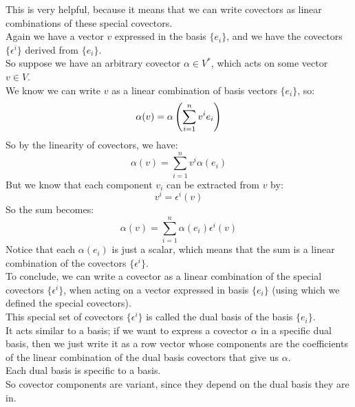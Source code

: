 \documentclass[12pt]{article}
\begin{document}
This is very helpful, because it means
that we can write covectors as linear
combinations of these special covectors. \\
Again we have a vector $v$ expressed
in the basis $\{ e_i \}$,
and we have the covectors $\{\epsilon^i\}$
derived from $\{ e_i \}$. \\
So suppose we have an arbitrary covector
$\alpha \in V^*$,
which acts on some vector $v \in V$. \\
We know we can write $v$ as a linear
combination of basis vectors $\{e_i\}$, so:
\[ \alpha(v) 
= \alpha\left( \sum_{i = 1}^{n} v^ie_i \right) \]
So by the linearity of covectors, we have:
\[ \alpha(v) = \sum_{i = 1}^{n} v^i\alpha(e_i) \]
But we know that each component
$v_i$ can be extracted from $v$ by:
\[ v^i = \epsilon^i(v) \]
So the sum becomes:
\[ \alpha(v) = \sum_{i = 1}^{n} 
\alpha(e_i)\epsilon^i(v) \]
Notice that each $\alpha(e_i)$
is just a scalar,
which means that the sum is a linear combination
of the covectors $\{ \epsilon^i \}$. \\
To conclude, we can write a covector
as a linear combination of the special
covectors $\{ \epsilon^i \}$,
when acting on a vector expressed
in basis $\{e_i\}$
(using which we defined the special covectors). \\

This special set of covectors $\{ \epsilon^i \}$
is called the dual basis of the basis $\{e_i\}$. \\
It acts similar to a basis;
if we want to express a covector $\alpha$
in a specific dual basis,
then we just write it as a row vector
whose components are the coefficients
of the linear combination of the dual basis
covectors that give us $\alpha$. \\

Each dual basis is specific to a basis. \\

So covector components are variant,
since they depend on the dual basis
they are in. \\
\end{document}
